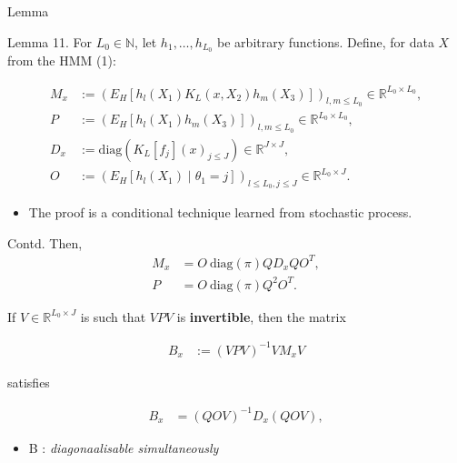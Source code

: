 \documentclass[10pt, aspectratio=169]{beamer}
\begin{document}
\begin{frame}{Lemma}

\begin{mytheorembox}{Lemma 11.}
 For \(L_0 \in \mathbb{N}\), let \(h_1, \ldots, h_{L_0}\) be arbitrary functions. Define, for data \(X\) from the HMM (1):

\begin{align*}
M_x &:= \left(E_H\left[h_l(X_1) K_L(x, X_2) h_m(X_3)\right]\right)_{l,m \leq L_0} \in \mathbb{R}^{L_0 \times L_0}, \\
P &:= \left(E_H\left[h_l(X_1) h_m(X_3)\right]\right)_{l,m \leq L_0} \in \mathbb{R}^{L_0 \times L_0}, \\
D_x &:= \text{diag}\left(K_L[f_j](x)_{j \leq J}\right) \in \mathbb{R}^{J \times J}, \\
O &:= \left(E_H\left[h_l(X_1) \mid \theta_1 = j\right]\right)_{l \leq L_0, j \leq J} \in \mathbb{R}^{L_0 \times J}.
\end{align*}

\end{mytheorembox}
   \begin{itemize}[label=\scalebox{0.5}{$\blacksquare$}]
        \item The proof is a conditional technique learned from stochastic process.
    \end{itemize}
\end{frame}

\begin{frame}

    \begin{mytheorembox}{Contd.}
    Then,
    \begin{align*}
    M_x &= O \ \text{diag}(\pi) Q D_x Q O^T, \\
    P &= O \ \text{diag}(\pi) Q^2 O^T.
    \end{align*}
    
    If \(V \in \mathbb{R}^{L_0 \times J}\) is such that \(V P V\) is \textbf{invertible}, then the matrix
    
    \begin{align*}
    B_x &:= (V P V)^{-1} V M_x V
    \end{align*}
    
    satisfies
    
    \begin{align*}
    B_x &= (Q O V)^{-1} D_x (Q O V),
    \end{align*}
    \end{mytheorembox}
    \begin{itemize}[label=\scalebox{0.5}{$\blacksquare$}]

        \item B : \textit{diagonaalisable simultaneously}
        
    \end{itemize}
\end{frame}
\end{document}
